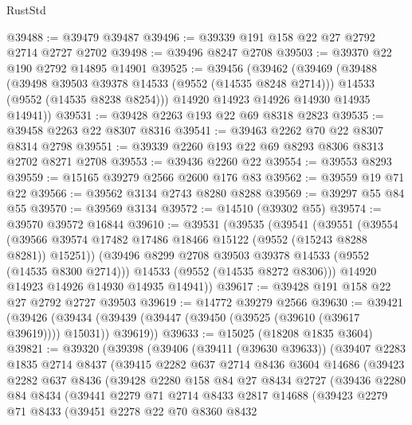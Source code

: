 \begin{lexlean}{RustStd}
\begin{coremodule}
@39488 := @39479 @39487
@39496 := @39339 @191 @158 @22 @27 @2792 @2714 @2727 @2702
@39498 := @39496 @8247 @2708
@39503 := @39370 @22 @190 @2792 @14895 @14901
@39525 := @39456
    (@39462
      (@39469
        (@39488
          (@39498 @39503 @39378 @14533 (@9552 (@14535 @8248 @2714)))
          @14533
          (@9552 (@14535 @8238 @8254)))
        @14920
        @14923
        @14926
        @14930
        @14935
        @14941))
@39531 := @39428 @2263 @193 @22 @69 @8318 @2823
@39535 := @39458 @2263 @22 @8307 @8316
@39541 := @39463 @2262 @70 @22 @8307 @8314 @2798
@39551 := @39339 @2260 @193 @22 @69 @8293 @8306 @8313 @2702 @8271 @2708
@39553 := @39436 @2260 @22
@39554 := @39553 @8293
@39559 := @15165 @39279 @2566 @2600 @176 @83
@39562 := @39559 @19 @71 @22
@39566 := @39562 @3134 @2743 @8280 @8288
@39569 := @39297 @55 @84 @55
@39570 := @39569 @3134
@39572 := @14510 (@39302 @55)
@39574 := @39570 @39572 @16844
@39610 := @39531
    (@39535
      (@39541
        (@39551
          (@39554 (@39566 @39574 @17482 @17486 @18466 @15122 (@9552 (@15243 @8288 @8281)) @15251))
          (@39496 @8299 @2708 @39503 @39378 @14533 (@9552 (@14535 @8300 @2714)))
          @14533
          (@9552 (@14535 @8272 @8306)))
        @14920
        @14923
        @14926
        @14930
        @14935
        @14941))
@39617 := @39428 @191 @158 @22 @27 @2792 @2727 @39503
@39619 := @14772 @39279 @2566
@39630 := @39421
    (@39426 (@39434 (@39439 (@39447 (@39450 (@39525 (@39610 (@39617 @39619)))) @15031)) @39619))
@39633 := @15025 (@18208 @1835 @3604)
@39821 := @39320
    (@39398
      (@39406
        (@39411 (@39630 @39633))
        (@39407
          @2283
          @1835
          @2714
          @8437
          (@39415
            @2282
            @637
            @2714
            @8436
            @3604
            @14686
            (@39423
              @2282
              @637
              @8436
              (@39428
                @2280
                @158
                @84
                @27
                @8434
                @2727
                (@39436
                  @2280
                  @84
                  @8434
                  (@39441
                    @2279
                    @71
                    @2714
                    @8433
                    @2817
                    @14688
                    (@39423
                      @2279
                      @71
                      @8433
                      (@39451
                        @2278
                        @22
                        @70
                        @8360
                        @8432

\end{coremodule}
\end{lexlean}
